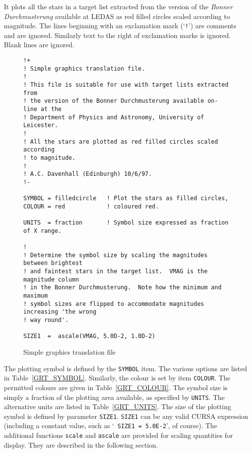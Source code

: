 \documentclass[twoside,11pt]{article}
\renewcommand{\_}{\texttt{\symbol{95}}}
\begin{document}
It plots all the stars in a target list extracted from the version of
the {\it Bonner Durchmusterung}\/ available at LEDAS as red filled circles
scaled according to magnitude.  The lines beginning with an exclamation mark
(`{\tt !}') are comments and are ignored.  Similarly text to the right
of exclamation marks is ignored.  Blank lines are ignored.

\begin{figure}[htbp]

\begin{verbatim}
!+
! Simple graphics translation file.
!
! This file is suitable for use with target lists extracted from
! the version of the Bonner Durchmusterung available on-line at the
! Department of Physics and Astronomy, University of Leicester.
!
! All the stars are plotted as red filled circles scaled according
! to magnitude.
!
! A.C. Davenhall (Edinburgh) 10/6/97.
!-

SYMBOL = filledcircle   ! Plot the stars as filled circles,
COLOUR = red            ! coloured red.

UNITS  = fraction       ! Symbol size expressed as fraction of X range.

!
! Determine the symbol size by scaling the magnitudes between brightest
! and faintest stars in the target list.  VMAG is the magnitude column
! in the Bonner Durchmusterung.  Note how the minimum and maximum
! symbol sizes are flipped to accommodate magnitudes increasing 'the wrong
! way round'.

SIZE1  =  ascale(VMAG, 5.0D-2, 1.0D-2)
\end{verbatim}

\caption{Simple graphics translation file \label{GRAPHTRAN} }

\end{figure}

The plotting symbol is defined by the {\tt SYMBOL} item.  The various
options are listed in Table~\ref{GRT_SYMBOL}.  Similarly, the colour
is set by item {\tt COLOUR}.  The permitted colours are given in
Table~\ref{GRT_COLOUR}.  The symbol size is simply a fraction of the
plotting area available, as specified by {\tt UNITS}.  The alternative
units are listed in Table~\ref{GRT_UNITS}.  The size of the plotting
symbol is defined by parameter {\tt SIZE1}.  {\tt SIZE1} can be any
valid CURSA expression (including a constant value, such as `{\tt
SIZE1~=~5.0E-2}', of course).  The additional functions {\tt scale}
and {\tt ascale} are provided for scaling quantities for display. They
are described in the following section.
\end{document}
